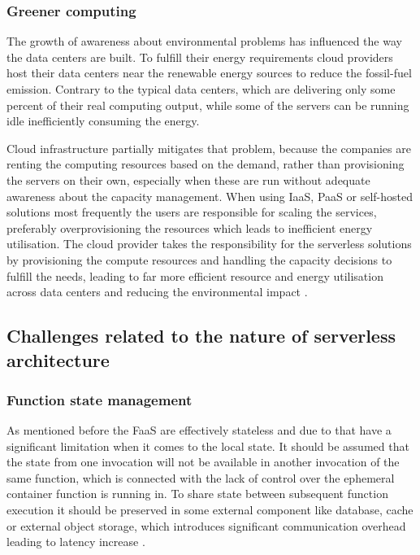 \subsubsection*{Greener computing}

The growth of awareness about environmental problems has influenced the way the data centers are built. To fulfill their energy requirements cloud providers host their data centers near the renewable energy sources to reduce the fossil-fuel emission. Contrary to the typical data centers, which are delivering only some percent of their real computing output, while some of the servers can be running idle inefficiently consuming the energy.

Cloud infrastructure partially mitigates that problem, because the companies are renting the computing resources based on the demand, rather than provisioning the servers on their own, especially when these are run without adequate awareness about the capacity management. When using IaaS, PaaS or self-hosted solutions most frequently the users are responsible for scaling the services, preferably overprovisioning the resources which leads  to inefficient energy utilisation. The cloud provider takes the responsibility for the serverless solutions by provisioning the compute resources and handling the capacity decisions to fulfill the needs, leading to far more efficient resource and energy utilisation across data centers and reducing the environmental impact \cite{MartinFowlerServerless}.

\subsection{Challenges related to the nature of serverless architecture}

\subsubsection*{Function state management}

As mentioned before the FaaS are effectively stateless and due to that have a significant limitation when it comes to the local state. It should be assumed that the state from one invocation will not be available in another invocation of the same function, which is connected with the lack of control over the ephemeral container function is running in. To share state between subsequent function execution it should be preserved in some external component like database, cache or external object storage, which introduces significant communication overhead leading to latency increase \cite{MartinFowlerServerless}.

